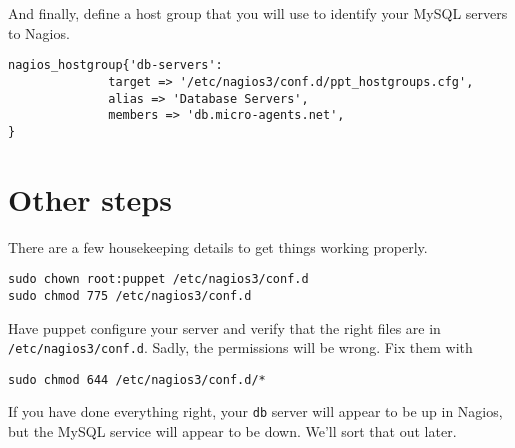 \documentclass{article}         %
\begin{document}
And finally, define a host group that you will use to 
identify your MySQL servers to Nagios.

\begin{verbatim}
nagios_hostgroup{'db-servers':
              target => '/etc/nagios3/conf.d/ppt_hostgroups.cfg',
              alias => 'Database Servers',
              members => 'db.micro-agents.net',
}

\end{verbatim}


\section{Other steps}

There are a few housekeeping details to get things working properly.

\begin{verbatim}
sudo chown root:puppet /etc/nagios3/conf.d
sudo chmod 775 /etc/nagios3/conf.d 
\end{verbatim}

Have puppet configure your server and verify that the right files are in 
\texttt{/etc/nagios3/conf.d}.  Sadly, the permissions will be wrong.  
Fix them with

\begin{verbatim}
sudo chmod 644 /etc/nagios3/conf.d/* 
\end{verbatim}

If you have done everything right, your \texttt{db} server will appear to be up in Nagios,
but the MySQL service will appear to be down. We'll sort that out later.
\end{document}
